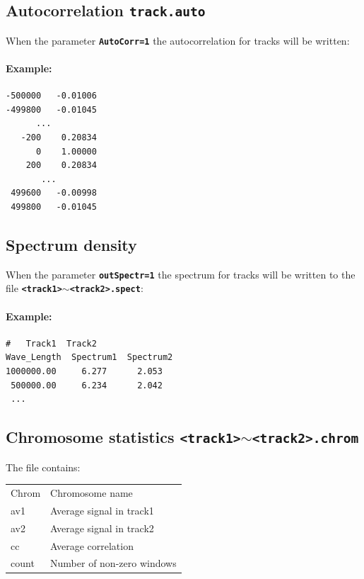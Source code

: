 \documentclass{article}
\newcommand{\tw}{\textwidth}
\newcommand{\prm}[1]{\texttt{\textbf{{#1}}}}
\begin{document}
\subsection{Autocorrelation \prm{track.auto}}
When the parameter \prm{AutoCorr=1} the autocorrelation for tracks will be written:

\paragraph{Example:}\;\;
\begin{minipage}{0.25\tw}
\begin{shaded} 
\begin{verbatim}
-500000   -0.01006
-499800   -0.01045
      ...
   -200    0.20834
      0    1.00000
    200    0.20834
       ...
 499600   -0.00998
 499800   -0.01045 
\end{verbatim}
\end{shaded}
\end{minipage}

\subsection{Spectrum density}
When the parameter \prm{outSpectr=1} the spectrum for tracks will be written to the file \prm{<track1>$\sim$<track2>.spect}:

\paragraph{Example:}\;\;
\begin{minipage}{0.35\tw}
\begin{shaded} 
\begin{verbatim}
#	Track1	Track2
Wave_Length  Spectrum1  Spectrum2
1000000.00     6.277      2.053
 500000.00     6.234      2.042
 ...
\end{verbatim}
\end{shaded}
\end{minipage}

\subsection{Chromosome statistics \prm{<track1>$\sim$<track2>.chrom}}
The file contains:
\begin{tabular}{ll}
Chrom    & Chromosome name\\
av1      & Average signal in track1\\
av2      & Average signal in track2\\
cc       & Average correlation\\
count    & Number of non-zero windows\\
\end{tabular}
\end{document}
